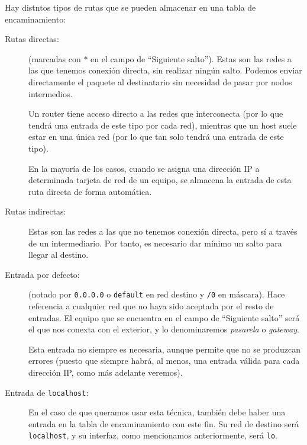 Hay distntos tipos de rutas que se pueden almacenar en una tabla de encaminamiento:
\begin{description}
    \item [Rutas directas:] (marcadas con $\ast$ en el campo de ``Siguiente salto''). Estas son las redes a las que tenemos conexión directa, sin realizar ningún salto. Podemos enviar directamente el paquete al destinatario sin necesidad de pasar por nodos intermedios.
    
    Un router tiene acceso directo a las redes que interconecta (por lo que tendrá una entrada de este tipo por cada red), mientras que un host suele estar en una única red (por lo que tan solo tendrá una entrada de este tipo).

    En la mayoría de los casos, cuando se asigna una dirección IP a determinada tarjeta de red de un equipo, se almacena la entrada de esta ruta directa de forma automática.
    \item [Rutas indirectas:] Estas son las redes a las que no tenemos conexión directa, pero sí a través de un intermediario. Por tanto, es necesario dar mínimo un salto para llegar al destino.
     
    \item [Entrada por defecto:] (notado por \verb|0.0.0.0| o \verb|default| en red destino y \verb|/0| en máscara). Hace referencia a cualquier red que no haya sido aceptada por el resto de entradas. El equipo que se encuentra en el campo de ``Siguiente salto'' será el que nos conexta con el exterior, y lo denominaremos \emph{pasarela} o \textit{gateway}.
    
    Esta entrada no siempre es necesaria, aunque permite que no se produzcan errores (puesto que siempre habrá, al menos, una entrada válida para cada dirección IP, como más adelante veremos).
    
    \begin{comment}
    Además, poner simplemente un \verb|\0| en máscara es equivalente a una entrada por defecto (algo que veremos cuando entendamos el uso de estas tablas).
    \end{comment}

    \item [Entrada de \texttt{localhost}:] En el caso de que queramos usar esta técnica, también debe haber una entrada en la tabla de encaminamiento con este fin. Su red de destino será \verb|localhost|, y su interfaz, como mencionamos anteriormente, será \verb|lo|.
\end{description}

